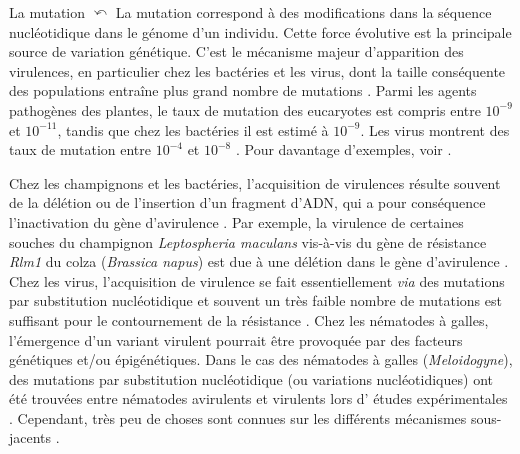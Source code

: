 
\hypertarget{mut1}{}
\begin{encadre2}{La mutation}
\hyperlink{mut2}{$\curvearrowleft$}
	La mutation correspond à des modifications dans  la séquence
nucléotidique dans le génome d'un individu. Cette force évolutive est la principale source de variation génétique. C’est le mécanisme majeur
d’apparition des virulences, en particulier chez les bactéries et les virus, dont la taille conséquente des populations entraîne  plus grand nombre de mutations \citep{McDonald2002}. Parmi les agents pathogènes des plantes, le taux
de mutation des eucaryotes est compris entre $10^{-9}$ et $10^{-11}$, tandis que chez les bactéries il est
estimé à $10^{-9}$. Les virus montrent des taux de mutation entre $10^{-4}$ et $10^{-8}$ \citep{Drake1998,
Drake1999}. Pour davantage d'exemples, voir \citep{Lynch2010}. 
\par
Chez les champignons et les bactéries, l’acquisition de
virulences résulte souvent de la délétion ou de l'insertion
d’un fragment d’ADN, qui a pour conséquence l’inactivation du gène d’avirulence
\citep{Kang2001, Gout2007}.
Par exemple, la virulence de certaines souches du champignon \textit{Leptospheria maculans} vis-à-vis du gène de résistance \textit{Rlm1} du colza (\textit{Brassica napus}) est due à une délétion dans le gène d’avirulence \citep{Gout2007}. Chez les virus, l’acquisition de virulence se fait
essentiellement \textit{via} des mutations par substitution nucléotidique et souvent un très
faible nombre de mutations est suffisant pour le contournement de la résistance  \citep{Jenner2000, Moury2004, Janzac2010}. 
Chez les nématodes à galles, l'émergence d'un variant virulent  pourrait être provoquée par des facteurs génétiques et/ou épigénétiques. 
Dans le cas des nématodes à galles (\textit{Meloidogyne}),  des mutations par substitution nucléotidique (ou variations nucléotidiques) ont été trouvées entre
nématodes avirulents et virulents lors d' études expérimentales
\citep{Neveu2003, Semblat2001}. Cependant, très peu de choses sont connues sur les  différents   mécanismes sous-jacents \citep{Castagnone-Sereno1994, Castagnone-sereno2019}.
\end{encadre2}

